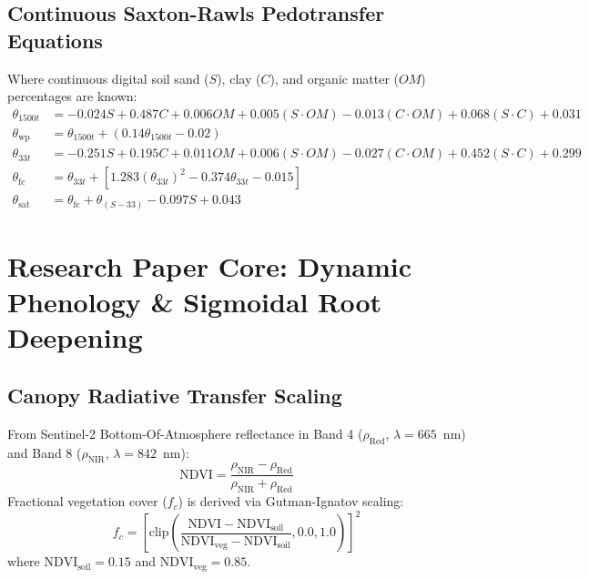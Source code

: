 \documentclass[11pt,a4paper]{article}
\theoremstyle{definition}
\theoremstyle{remark}
\begin{document}
\subsection{Continuous Saxton-Rawls Pedotransfer Equations}
Where continuous digital soil sand ($S$), clay ($C$), and organic matter ($OM$) percentages are known:
\begin{align}
    \theta_{1500t} &= -0.024 S + 0.487 C + 0.006 OM + 0.005 (S \cdot OM) - 0.013 (C \cdot OM) + 0.068 (S \cdot C) + 0.031 \\
    \theta_{\text{wp}} &= \theta_{1500t} + (0.14 \theta_{1500t} - 0.02) \\
    \theta_{33t} &= -0.251 S + 0.195 C + 0.011 OM + 0.006 (S \cdot OM) - 0.027 (C \cdot OM) + 0.452 (S \cdot C) + 0.299 \\
    \theta_{\text{fc}} &= \theta_{33t} + [1.283 (\theta_{33t})^2 - 0.374 \theta_{33t} - 0.015] \\
    \theta_{\text{sat}} &= \theta_{\text{fc}} + \theta_{(S-33)} - 0.097 S + 0.043
\end{align}


\section{Research Paper Core: Dynamic Phenology \& Sigmoidal Root Deepening}

\subsection{Canopy Radiative Transfer Scaling}
From Sentinel-2 Bottom-Of-Atmosphere reflectance in Band 4 ($\rho_{\text{Red}}$, $\lambda = 665$~nm) and Band 8 ($\rho_{\text{NIR}}$, $\lambda = 842$~nm):
\begin{equation}
    \text{NDVI} = \frac{\rho_{\text{NIR}} - \rho_{\text{Red}}}{\rho_{\text{NIR}} + \rho_{\text{Red}}}
\end{equation}
Fractional vegetation cover ($f_c$) is derived via Gutman-Ignatov scaling:
\begin{equation}
    f_c = \left[ \text{clip}\left(\frac{\text{NDVI} - \text{NDVI}_{\text{soil}}}{\text{NDVI}_{\text{veg}} - \text{NDVI}_{\text{soil}}}, 0.0, 1.0\right) \right]^2
\end{equation}
where $\text{NDVI}_{\text{soil}} = 0.15$ and $\text{NDVI}_{\text{veg}} = 0.85$.
\end{document}
